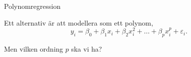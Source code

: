 \documentclass[10pt,english]{beamer}
\begin{document}
\begin{frame}{Polynomregression}

    Ett alternativ är att modellera som ett polynom,
    \begin{equation*}
        y_i = \beta_0 + \beta_1 x_i + \beta_2 x_i^2 + \ldots + \beta_p x_i^p + \varepsilon_i.
    \end{equation*}

    Men vilken ordning $p$ ska vi ha?

    
\end{frame}

    
\end{document}
